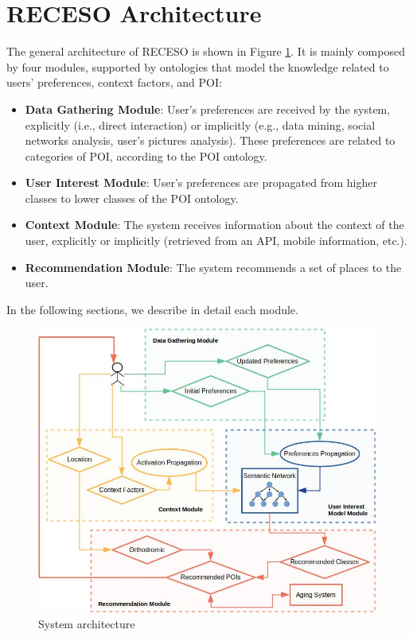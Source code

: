 \section{RECESO Architecture}
\label{sec:proposal}

The general architecture of RECESO is shown in Figure \ref{fig:arquitecture}. It is mainly composed by four modules, supported by ontologies that model the knowledge related to users' preferences, context factors, and POI:  
\begin{itemize}
    \item \textbf{Data Gathering Module}: User's preferences are received by the system, explicitly (i.e., direct interaction) or implicitly (e.g., data mining, social networks analysis, user's pictures analysis). These preferences are related to categories of POI, according to the POI ontology. 
    \item \textbf{User Interest Module}: User's preferences are propagated from higher classes to lower classes of the POI ontology.
    \item \textbf{Context Module}: The system receives information about the context of the user, explicitly or implicitly (retrieved from an API, mobile information, etc.).
    \item \textbf{Recommendation Module}: The system recommends a set of places to the user.
\end{itemize}

      
In the following sections, we describe in detail each module.


\begin{figure}[h]
\centering
\includegraphics[scale=0.4]{draws/arquitecture.jpg}
\caption{System architecture}
\label{fig:arquitecture}
\end{figure}


